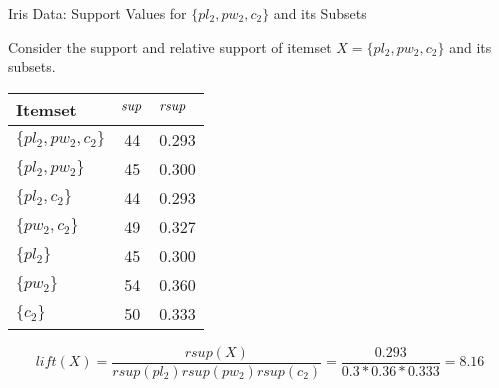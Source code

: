 \begin{frame}{Iris Data: Support Values for $\{pl_2, pw_2, c_2\}$ and
  its Subsets}

Consider the support and relative support of itemset $X=\{pl_2, pw_2, c_2\}$ and its subsets.
\begin{center}
\begin{tabular}{|l|c|l|}
\hline
Itemset & $\mathit{sup}$ & $\mathit{rsup}$ \\ \hline
$\{pl_2, pw_2, c_2\}$ &  44 & 0.293\\ \hline\hline
$\{pl_2, pw_2\}$ &  45 & 0.300\\ \hline
$\{pl_2, c_2\}$ &  44 & 0.293\\ \hline
$\{pw_2, c_2\}$ &  49 & 0.327\\ \hline
$\{pl_2\}$ &  45 & 0.300\\ \hline
$\{pw_2\}$ &  54 & 0.360\\ \hline
$\{c_2\}$ &  50 & 0.333\\ \hline
\end{tabular}%
\end{center}

\[
lift(X) = \frac{rsup(X)}{rsup(pl_2)rsup(pw_2)rsup(c_2)}=\frac{0.293}{0.3*0.36*0.333}=8.16
\]

\end{frame}


